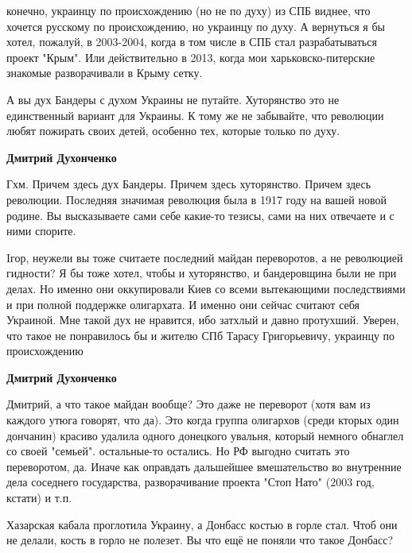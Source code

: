 \begin{itemize}
\begin{itemize}
конечно, украинцу по происхождению (но не по духу) из СПБ виднее, что хочется
русскому по происхождению, но украинцу по духу. А вернуться я бы хотел,
пожалуй, в 2003-2004, когда в том числе в СПБ стал разрабатываться проект
"Крым". Или действительно в 2013, когда мои харьковско-питерские знакомые
разворачивали в Крыму сетку.


А вы дух Бандеры с духом Украины не путайте.
Хуторянство это не единственный вариант для Украины.
К тому же не забывайте, что революции любят пожирать своих детей, особенно тех, которые только по духу.

\textbf{Дмитрий Духонченко} 

Гхм. Причем здесь дух Бандеры. Причем здесь хуторянство. Причем здесь
революции. Последняя значимая революция была в 1917 году на вашей новой родине.
Вы высказываете сами себе какие-то тезисы, сами на них отвечаете и с ними
спорите.



Iгор, неужели вы тоже считаете последний майдан переворотов, а не революцией гидности?
Я бы тоже хотел, чтобы и хуторянство, и бандеровщина были не при делах.
Но именно они оккупировали Киев со всеми вытекающими последствиями и при полной поддержке олигархата.
И именно они сейчас считают себя Украиной.
Мне такой дух не нравится, ибо затхлый и давно протухший.
Уверен, что такое не понравилось бы и жителю СПб Тарасу Григорьевичу, украинцу по происхождению

\textbf{Дмитрий Духонченко} 

Дмитрий, а что такое майдан вообще? Это даже не переворот (хотя вам из каждого
утюга говорят, что да). Это когда группа олигархов (среди кторых один дончанин)
красиво удалила одного донецкого увальня, который немного обнаглел со своей
"семьей". остальные-то остались. Но РФ выгодно считать это переворотом, да.
Иначе как оправдать дальшейшее вмешательство во внутренние дела соседнего
государства, разворачивание проекта "Стоп Нато" (2003 год, кстати) и т.п.

\end{itemize} %


Хазарская кабала проглотила Украину, а Донбасс костью в горле стал. Чтоб они не
делали, кость в горло не полезет. Вы что ещё не поняли что такое Донбасс?




\end{itemize}
